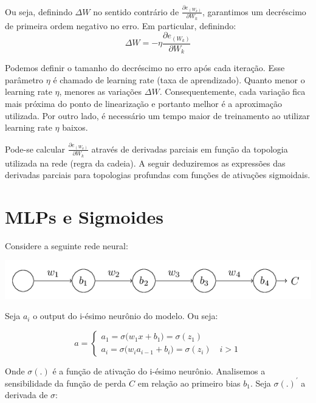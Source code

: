 \documentclass[
	12pt,				%
	oneside,			%
	a4paper,			%
	english,			%
	french,				%
	spanish,			%
	brazil,				%
	]{abntex2}
\begin{document}
Ou seja, definindo $\Delta W$ no sentido contr\'ario de $ \frac{ \partial e_{(W_{k})} } { \partial W_k }$, garantimos um decr\'escimo de primeira ordem negativo no erro. Em particular, definindo: 
$$\Delta W = - \eta  \frac{ \partial e_{(W_{k})} } { \partial W_k }  $$

Podemos definir o tamanho do decr\'escimo no erro ap\'os cada itera\c{c}\~ao. Esse par\^ametro $\eta$ \'e chamado de learning rate (taxa de aprendizado). Quanto menor o learning rate $\eta$, menores as varia\c{c}\~oes $\Delta W$. Consequentemente, cada variação fica mais próxima do ponto de linearização e portanto melhor \'e a aproxima\c{c}\~ao utilizada. Por outro lado, é necessário um tempo maior de treinamento ao utilizar learning rate $\eta$ baixos.

Pode-se calcular $ \frac{ \partial e_{(W_{k})} } { \partial W_k }$ através de derivadas parciais em fun\c{c}\~ao da topologia utilizada na rede (regra da cadeia). A seguir deduziremos as expressões das derivadas parciais para topologias profundas com funções de ativações sigmoidais.

\section{MLPs e Sigmoides}

Considere a seguinte rede neural:

\begin{center}
	\includegraphics[scale=0.8]{nnetsimples.png}
\end{center} 

Seja $a_i$ o output do i-\'esimo neur\^onio do modelo. Ou seja:


$$a = \begin{cases}
a_1 = \sigma\big( w_1 x + b_1\big) = \sigma( z_1 ) \\
a_i = \sigma\big( w_i a_{i-1} + b_i\big) = \sigma( z_i ) \enspace \enspace i>1
\end{cases}$$

Onde $\sigma(.)$ \'e a fun\c{c}\~ao de ativa\c{c}\~ao do i-\'esimo neur\^onio. Analisemos a sensibilidade da fun\c{c}\~ao de perda $C$ em rela\c{c}\~ao ao primeiro bias $b_1$. Seja $\sigma(.)^{'}$ a derivada de $\sigma$:
\end{document}
